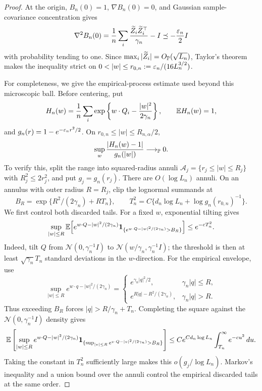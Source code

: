 \begin{proof}
At the origin, \(B_n(0)=1\), \(\nabla B_n(0)=0\), and Gaussian
sample-covariance concentration gives
\[
 \nabla^2B_n(0)
 =\frac1n\sum_i\frac{\widetilde Z_i\widetilde Z_i^\top}{\gamma_n}-I
 \preceq-\frac{\varepsilon_n}{2}I
\]
with probability tending to one.  Since
\(\max_i|\widetilde Z_i|=O_{\mathbb P}(\sqrt{L_n})\), Taylor's theorem makes
the inequality strict on
\(0<|w|\le r_{0,n}:=\eps_n/(16L_n^{3/2})\).

For completeness, we give the empirical-process estimate used beyond this
microscopic ball.  Before centering, put
\[
 H_n(w)=\frac1n\sum_i
 \exp\left\{w\cdot Q_i-\frac{|w|^2}{2\gamma_n}\right\},
 \qquad \mathbb E H_n(w)=1,
\]
and \(g_n(r)=1-e^{-\varepsilon_nr^2/2}\).  On
\(r_{0,n}\le|w|\le R_{n,\alpha}/2\),
\begin{equation}
\label{eq:slow-bulk-process}
 \sup_w\frac{|H_n(w)-1|}{g_n(|w|)}\longrightarrow_{\mathbb P}0.
\end{equation}
To verify this, split the range into squared-radius annuli
\(\mathcal A_j=\{r_j\le |w|\le R_j\}\) with \(R_j^2\le2r_j^2\), and put
\(g_j=g_n(r_j)\).  There are \(O(\log L_n)\) annuli.  On an annulus with
outer radius \(R=R_j\), clip the lognormal summands at
\[
 B_R=\exp\{R^2/(2\gamma_n)+RT_n\},
 \qquad
 T_n^2=C\{d_n\log L_n+\log g_n(r_{0,n})^{-1}\}.
\]
We first control both discarded tails.  For a fixed \(w\), exponential
tilting gives
\[
 \sup_{|w|\le R}
 \mathbb E\!\left[
  e^{w\cdot Q-|w|^2/(2\gamma_n)}
  \mathbf1_{\{e^{w\cdot Q-|w|^2/(2\gamma_n)}>B_R\}}
 \right]
 \le e^{-cT_n^2}.
\]
Indeed, tilt \(Q\) from
\(\mathcal N(0,\gamma_n^{-1}I)\) to
\(\mathcal N(w/\gamma_n,\gamma_n^{-1}I)\); the threshold is then at least
\(\sqrt{\gamma_n}T_n\) standard deviations in the \(w\)-direction.  For the
empirical envelope, use
\[
 \sup_{|w|\le R}
 e^{w\cdot q-|w|^2/(2\gamma_n)}
 =
 \begin{cases}
  e^{\gamma_n|q|^2/2},&\gamma_n|q|\le R,\\
  e^{R|q|-R^2/(2\gamma_n)},&\gamma_n|q|>R.
 \end{cases}
\]
Thus exceeding \(B_R\) forces \(|q|>R/\gamma_n+T_n\).  Completing the
square against the \(\mathcal N(0,\gamma_n^{-1}I)\) density gives
\[
 \mathbb E\left[
  \sup_{|w|\le R}
  e^{w\cdot Q-|w|^2/(2\gamma_n)}
  \mathbf1_{\{\sup_{|v|\le R}
    e^{v\cdot Q-|v|^2/(2\gamma_n)}>B_R\}}
 \right]
 \le
 C e^{C d_n\log L_n}
 \int_{T_n}^{\infty}e^{-cu^2}\,du.
\]
Taking the constant in \(T_n^2\) sufficiently large makes this
\(o(g_j/\log L_n)\).  Markov's inequality and a union bound over the
annuli control the empirical discarded tails at the same order.


\end{proof}
